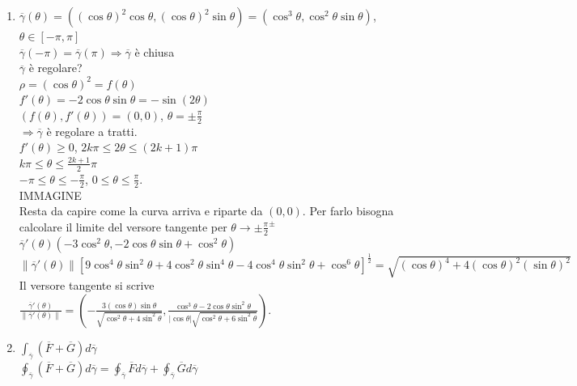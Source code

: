 \documentclass{article}
\begin{document}
\begin{enumerate}
    \item $\overline{\gamma}(\theta)=((\cos \theta)^2\cos \theta, (\cos \theta)^2 \sin \theta)=(\cos^3 \theta, \cos ^2 \theta \sin \theta)$, $\theta \in [-\pi,\pi]$\\
    $\overline{\gamma}(-\pi)=\overline{\gamma}(\pi)\Rightarrow \overline{\gamma}$ è chiusa\\
    $\overline{\gamma}$ è regolare?\\
    $\rho=(\cos \theta )^2=f(\theta)$\\
    $f'(\theta)=-2\cos \theta \sin \theta=-\sin(2\theta)$\\
    $(f(\theta), f'(\theta))=(0,0)$, $\theta = \pm\frac{\pi}{2}$\\
    $\Rightarrow \overline{\gamma} $ è regolare a tratti.\\
    $f'(\theta) \geq 0$, $2k\pi \leq 2\theta \leq (2k+1)\pi$\\
    $k\pi \leq \theta \leq \frac{2k+1}{2}\pi$\\
    $-\pi \leq \theta \leq -\frac{\pi}{2}$, $0 \leq \theta \leq \frac{\pi}{2}$.\\
    IMMAGINE\\
    Resta da capire come la curva arriva e riparte da $(0,0)$. Per farlo bisogna calcolare il limite del versore tangente per $\theta \rightarrow \pm \frac{\pi}{2}^{\pm}$\\
    $\overline{\gamma}'(\theta)(-3\cos^2 \theta, -2 \cos \theta \sin \theta + \cos^2\theta)$\\
    $\parallel \overline{\gamma}' (\theta)\parallel \left[ 9\cos^4\theta \sin^2 \theta+4\cos^2\theta \sin^4 \theta - 4 \cos^4 \theta \sin^2 \theta+\cos ^6 \theta \right]^{\frac{1}{2}}=\sqrt{
    (\cos\theta)^4 + 4 (\cos \theta )^2(\sin \theta)^2}$\\
    Il versore tangente si scrive\\
    $\frac{\overline{\gamma}'(\theta)}{\parallel \overline{\gamma}'(\theta) \parallel} =\left( -\frac{3 (\cos \theta)\sin \theta}{\sqrt{\cos^2 \theta + 4 \sin^2 \theta}}, \frac{\cos^3 \theta - 2\cos \theta \sin^2 \theta}{|\cos \theta|\sqrt{\cos^2 \theta + 6\sin^2 \theta}} \right)$.
    \item $\int_{\overline{\gamma}}(\overline{F}+\overline{G})d\overline{\gamma}$\\
    $\oint_{\overline{\gamma}}(\overline{F}+\overline{G})d\overline{\gamma} =\oint_{\overline{\gamma}}\overline{F}d\overline{\gamma}+\oint_{\overline{\gamma}}\overline{G}d\overline{\gamma}$\\

\end{enumerate}
\end{document}
